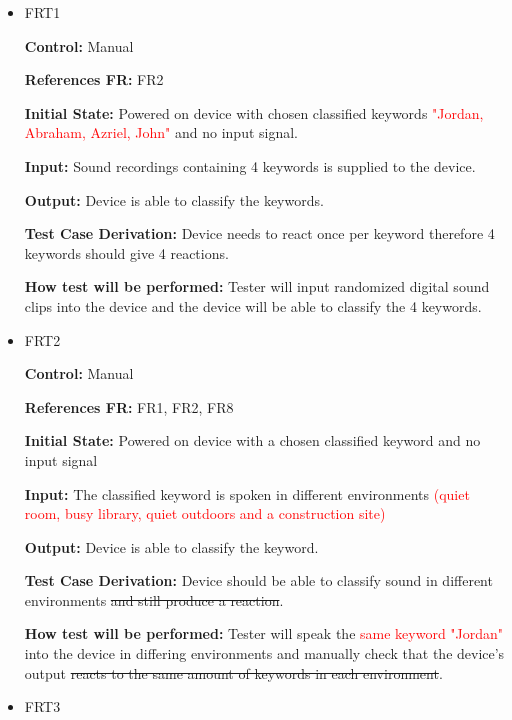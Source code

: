 \documentclass[12pt, titlepage]{article}
\begin{document}
\begin{itemize}

\item{FRT1}

\textbf{Control:} Manual

\textbf{References FR:} FR2 					

\textbf{Initial State:} Powered on device with chosen classified keywords \textcolor{red}{"Jordan, Abraham, Azriel, John"} and no input signal.
					
\textbf{Input:} Sound recordings containing 4 keywords is supplied to the device.
					
\textbf{Output:} Device is able to classify the keywords.

\textbf{Test Case Derivation:} Device needs to react once per keyword therefore 4 keywords should give 4 reactions.
					
\textbf{How test will be performed:} Tester will input randomized digital sound clips into the device and the device will be able to classify the 4 keywords.
 

\item{FRT2}

\textbf{Control:} Manual

\textbf{References FR:} FR1, FR2, FR8 					

\textbf{Initial State:} Powered on device with a chosen classified keyword and no input signal 
					
\textbf{Input:} The classified keyword is spoken in different environments \textcolor{red}{(quiet room, busy library, quiet outdoors and a construction site)}
					
\textbf{Output:} Device is able to classify the keyword.

\textbf{Test Case Derivation:} Device should be able to classify sound in different environments \sout{and still produce a reaction}.
					
\textbf{How test will be performed:} Tester will speak the \textcolor{red}{same keyword "Jordan"} into the device in differing environments and manually check that the device's output \sout{reacts to the same amount of keywords in each environment}. 

\item{FRT3}


\end{itemize}
\end{document}
